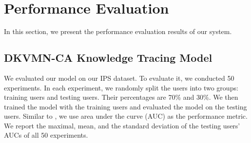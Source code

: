 \documentclass{edm_template}
\begin{document}
\section{Performance Evaluation}

In this section, we present the performance evaluation results of our system. 

\subsection{DKVMN-CA Knowledge Tracing Model}

We evaluated our model on our IPS dataset. To evaluate it, we conducted 50 experiments. In each experiment, we randomly split the users into two groups: training users and testing users. Their percentages are 70\% and 30\%. We then trained the model with the training users and evaluated the model on the testing users. Similar to \cite{dkt}, we use area under the curve (AUC) as the performance metric. We report the maximal, mean, and the standard deviation of the testing users' AUCs of all 50 experiments.
\end{document}
